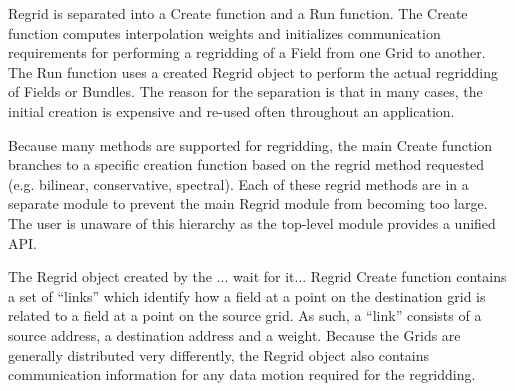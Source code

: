 Regrid is separated into a Create function and a
Run function. The Create function computes
interpolation weights and initializes communication
requirements for performing a regridding of a Field
from one Grid to another.  The Run function uses
a created Regrid object to perform the actual regridding
of Fields or Bundles.  The reason for the separation
is that in many cases, the initial creation is
expensive and re-used often throughout an application.

Because many methods are supported for regridding,
the main Create function branches to a specific
creation function based on the regrid method requested
(e.g. bilinear, conservative, spectral).  Each of
these regrid methods are in a separate module to
prevent the main Regrid module from becoming too
large.  The user is unaware of this hierarchy as the
top-level module provides a unified API.

The Regrid object created by the ... wait for it...
Regrid Create function contains a set of ``links''
which identify how a field at a point on the
destination grid is related to a field at a
point on the source grid.  As such, a ``link''
consists of a source address, a destination address
and a weight.  Because the Grids are generally
distributed very differently, the Regrid object
also contains communication information
for any data motion required for the regridding.

